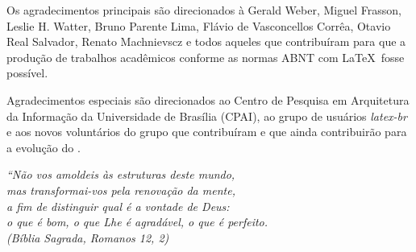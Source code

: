 \documentclass[
    article,
	12pt,				%
	openright,			%
	twoside,			%
	a4paper,			%
	english,			%
	spanish,			%
	brazil,				%
	]{abntex2}
\begin{document}
\begin{agradecimentos}
Os agradecimentos principais são direcionados à Gerald Weber, Miguel Frasson,
Leslie H. Watter, Bruno Parente Lima, Flávio de Vasconcellos Corrêa, Otavio Real
Salvador, Renato Machnievscz e todos aqueles que
contribuíram para que a produção de trabalhos acadêmicos conforme
as normas ABNT com \LaTeX\ fosse possível.

Agradecimentos especiais são direcionados ao Centro de Pesquisa em Arquitetura da Informação da Universidade de Brasília (CPAI), ao grupo de usuários \emph{latex-br} e aos novos voluntários do grupo que contribuíram e que ainda contribuirão para a evolução do \abnTeX.
\end{agradecimentos}


\begin{epigrafe}
    \vspace*{\fill}
	\begin{flushright}
		\textit{``Não vos amoldeis às estruturas deste mundo, \\
		mas transformai-vos pela renovação da mente, \\
		a fim de distinguir qual é a vontade de Deus: \\
		o que é bom, o que Lhe é agradável, o que é perfeito.\\
		(Bíblia Sagrada, Romanos 12, 2)}
	\end{flushright}
\end{epigrafe}
\newpage
\newpage

\end{document}
